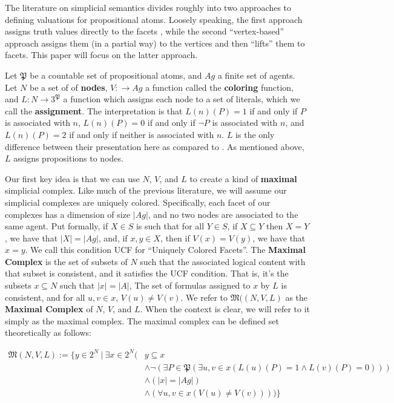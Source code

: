 \documentclass[11pt]{article}
\theoremstyle{definition}
\newcommand{\defin}[1]{\textbf{#1}}
\begin{document}
	The literature on simplicial semantics divides roughly into two approaches to defining valuations for propositional atoms. Loosely speaking, the first approach assigns truth values directly to the facets \cite{Death,FA,SimpSet},	while the second ``vertex-based'' approach assigns them (in a partial way) to the vertices and then ``lifts'' them to facets. \cite{DoA,KaSC,SimpDEL,HG} This paper will focus on the latter approach.
	
	Let $\mathfrak{P}$ be a countable set of propositional atoms, and $Ag$ a finite set of agents. Let $N$ be a set of of \defin{nodes}, $V:\rightarrow Ag$ a function called the \defin{coloring} function, and $L:N\rightarrow 3^\mathfrak{P}$ a function which assigns each node to a set of literals, which we call the \defin{assignment}. The interpretation is that $L(n)(P)=1$ if and only if $P$ is associated with $n$, $L(n)(P)=0$ if and only if $\neg P$ is associated with $n$, and $L(n)(P)=2$ if and only if neither is associated with $n$. $L$ is the only difference between their presentation here as compared to \cite{BelSimp}. As mentioned above, $L$ assigns propositions to nodes.
	
	Our first key idea is that we can use $N$, $V$, and $L$ to create a kind of \defin{maximal} simplicial complex. Like much of the previous literature, we will assume our simplicial complexes are uniquely colored. Specifically, each facet of our complexes has a dimension of size $|Ag|$, and no two nodes are associated to the same agent. Put formally, if $X\in S$ is such that for all $Y\in S$, if $X\subseteq Y$ then $X=Y$, we have that $|X|=|Ag|$, and, if $x,y\in X$, then if $V(x)=V(y)$, we have that $x=y$. We call this condition UCF for ``Uniquely Colored Facets''. The \defin{Maximal Complex} is the set of subsets of $N$ such that the associated logical content with that subset is consistent, and it satisfies the UCF condition. That is, it's the subsets $x\subseteq N$ such that $|x|=|A|$, The set of formulas assigned to $x$ by $L$ is consistent, and for all $u,v\in x$, $V(u)\neq V(v)$. We refer to $\mathfrak{M}((N,V,L)$ as the \defin{Maximal Complex} of $N$, $V$, and $L$. When the context is clear, we will refer to it simply as the maximal complex. The maximal complex can be defined set theoretically as follows:
	
	\begin{align*}
		\mathfrak{M}(N,V,L):=\{y\in 2^N~|~\exists x\in 2^N (&y\subseteq x\\&\wedge\neg(\exists P\in\mathfrak{P}(\exists u,v\in x(L(u)(P)=1\wedge L(v)(P)=0))) \\&\wedge (|x|=|Ag|)
		\\&\wedge (\forall u,v\in x(V(u)\neq V(v))))\}
	\end{align*}
	
\end{document}
